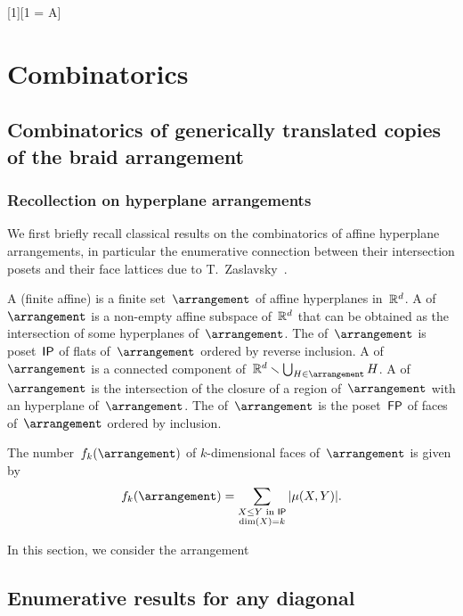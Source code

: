 
[1][1 = A]{} %

\section{Combinatorics}

\subsection{Combinatorics of generically translated copies of the braid arrangement}
\label{sec:kBraidArrangement}

\subsubsection{Recollection on hyperplane arrangements}
\label{subsec:arrangements}

We first briefly recall classical results on the combinatorics of affine hyperplane arrangements, in particular the enumerative connection between their intersection posets and their face lattices due to T.~Zaslavsky~\cite{Zaslavsky}.

\begin{definition}
A (finite affine)  is a finite set~$\arrangement$ of affine hyperplanes in~$\mathbb R^d$.
A  of~$\arrangement$ is a non-empty affine subspace of~$\mathbb R^d$ that can be obtained as the intersection of some hyperplanes of~$\arrangement$.
The  of~$\arrangement$ is poset~$\mathsf{IP}$ of flats of~$\arrangement$ ordered by reverse inclusion.
A  of~$\arrangement$ is a connected component of~$\R^d \ssm \bigcup_{H \in \arrangement} H$.
A  of~$\arrangement$ is the intersection of the closure of a region of~$\arrangement$ with an hyperplane of~$\arrangement$.
The  of~$\arrangement$ is the poset~$\mathsf{FP}$ of faces of~$\arrangement$ ordered by inclusion.
\end{definition}

\begin{theorem}
The number~$f_k(\arrangement)$ of $k$-dimensional faces of~$\arrangement$ is given by
\[
f_k(\arrangement) = \sum_{\substack{X \le Y \text{ in } \intersectionPoset \\ \dim(X) = k}} |\mu(X,Y)|.
\]
\end{theorem}

In this section, we consider the arrangement

\subsection{Enumerative results for any diagonal} 
\label{s:facets}

